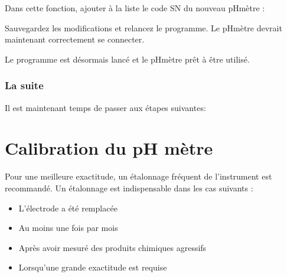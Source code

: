 \documentclass[letterpaper,10pt,french]{sphinxmanual}
\begin{document}
\sphinxAtStartPar
Dans cette fonction, ajouter à la liste  le code SN du nouveau pH\sphinxhyphen{}mètre :

\noindent{}

\sphinxAtStartPar
Sauvegardez les modifications et relancez le programme. Le pH\sphinxhyphen{}mètre devrait maintenant correctement se connecter.

\sphinxAtStartPar
Le programme est désormais lancé et le pH\sphinxhyphen{}mètre prêt à être utilisé.


\subsection{La suite}
\label{\detokenize{install:la-suite}}
\sphinxAtStartPar
Il est maintenant temps de passer aux étapes suivantes:

\sphinxAtStartPar
{\hyperref[\detokenize{calib:calibration}]{}}

\sphinxAtStartPar
{\hyperref[\detokenize{mesure:mesure}]{}}

\sphinxAtStartPar
{\hyperref[\detokenize{graph:graph}]{}}

\sphinxstepscope


\chapter{Calibration du pH mètre}
\label{\detokenize{calib:calibration-du-ph-metre}}\label{\detokenize{calib:calibration}}\label{\detokenize{calib::doc}}
\sphinxAtStartPar
Pour une meilleure exactitude, un étalonnage fréquent de l’instrument est recommandé. Un étalonnage
est indispensable dans les cas suivants :
\begin{itemize}
\item {} 
\sphinxAtStartPar
L’électrode a été remplacée

\item {} 
\sphinxAtStartPar
Au moins une fois par mois

\item {} 
\sphinxAtStartPar
Après avoir mesuré des produits chimiques agressifs

\item {} 
\sphinxAtStartPar
Lorsqu’une grande exactitude est requise

\end{itemize}
\end{document}
